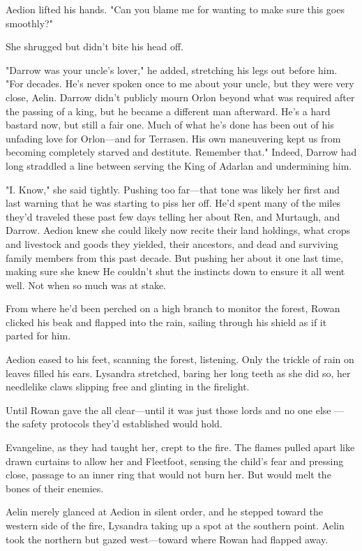 Aedion lifted his hands. "Can you blame me for wanting to make sure this goes smoothly?"

She shrugged but didn't bite his head off.

"Darrow was your uncle's lover," he added, stretching his legs out before him. "For decades. He's never spoken once to me about your uncle, but  they were very close, Aelin. Darrow didn't publicly mourn Orlon beyond what was required after the passing of a king, but he became a different man afterward. He's a hard bastard now, but still a fair one. Much of what he's done has been out of his unfading love for Orlon---and for Terrasen. His own maneuvering kept us from becoming completely starved and destitute. Remember that." Indeed, Darrow had long straddled a line between serving the King of Adarlan and undermining him.

"I. Know," she said tightly. Pushing too far---that tone was likely her first and last warning that he was starting to piss her off. He'd spent many of the miles they'd traveled these past few days telling her about Ren, and Murtaugh, and Darrow. Aedion knew she could likely now recite their land holdings, what crops and livestock and goods they yielded, their ancestors, and dead and surviving family members from this past decade. But pushing her about it one last time, making sure she knew  He couldn't shut the instincts down to ensure it all went well. Not when so much was at stake.

From where he'd been perched on a high branch to monitor the forest, Rowan clicked his beak and flapped into the rain, sailing through his shield as if it parted for him.

Aedion eased to his feet, scanning the forest, listening. Only the trickle of rain on leaves filled his ears. Lysandra stretched, baring her long teeth as she did so, her needlelike claws slipping free and glinting in the firelight.

Until Rowan gave the all clear---until it was just those lords and no one else ---the safety protocols they'd established would hold.

Evangeline, as they had taught her, crept to the fire. The flames pulled apart like drawn curtains to allow her and Fleetfoot, sensing the child's fear and pressing close, passage to an inner ring that would not burn her. But would melt the bones of their enemies.

Aelin merely glanced at Aedion in silent order, and he stepped toward the western side of the fire, Lysandra taking up a spot at the southern point. Aelin took the northern but gazed west---toward where Rowan had flapped away.

